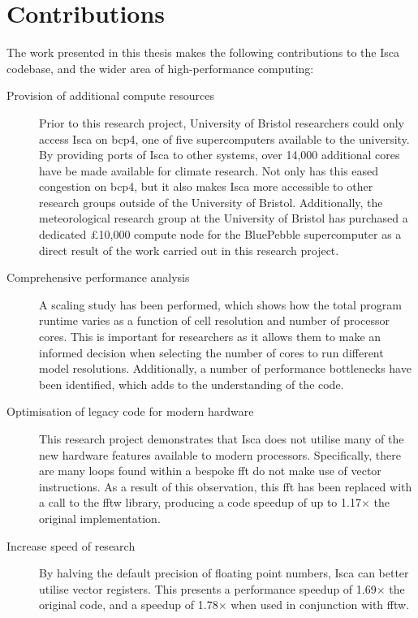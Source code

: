 \documentclass[a4paper,11pt]{report}
\begin{document}
\section{Contributions}
The work presented in this thesis makes the following contributions to the Isca codebase, and the wider area of high-performance computing:
\begin{description}
	\item[Provision of additional compute resources] Prior to this research project, University of Bristol researchers could only access Isca on \gls{bcp4}, one of five supercomputers available to the university. By providing ports of Isca to other systems, over 14,000 additional cores have be made available for climate research. Not only has this eased congestion on \gls{bcp4}, but it also makes Isca more accessible to other research groups outside of the University of Bristol. Additionally, the meteorological research group at the University of Bristol has purchased a dedicated £10,000 compute node for the BluePebble supercomputer as a direct result of the work carried out in this research project. 

	\item[Comprehensive performance analysis] A scaling study has been performed, which shows how the total program runtime varies as a function of cell resolution and number of processor cores. This is important for researchers as it allows them to make an informed decision when selecting the number of cores to run different model resolutions. Additionally, a number of performance bottlenecks have been identified, which adds to the understanding of the code. 
	
	\item[Optimisation of legacy code for modern hardware] This research project demonstrates that Isca does not utilise many of the new hardware features available to modern processors. Specifically, there are many loops found within a bespoke \gls{fft} do not make use of vector instructions. As a result of this observation, this \gls{fft} has been replaced with a call to the \gls{fftw} library, producing a code speedup of up to 1.17$\times$ the original implementation.
	
	\item[Increase speed of research] By halving the default precision of floating point numbers, Isca can better utilise vector registers. This presents a performance speedup of 1.69$\times$ the original code, and a speedup of 1.78$\times$ when used in conjunction with \gls{fftw}. 
	

\end{description}
\end{document}
